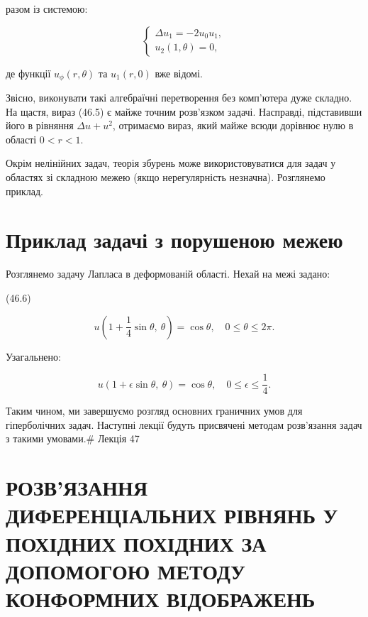 \documentclass[
  ukrainian,
]{article}
\begin{document}
разом із системою:

\[
\begin{cases}
\Delta u_{1} = -2u_{0}u_{1}, \\
u_{2}(1,\theta) = 0,
\end{cases}
\]

де функції \(u_{\phi}(r,\theta)\) та \(u_{1}(r,0)\) вже відомі.

Звісно, виконувати такі алгебраїчні перетворення без комп'ютера дуже
складно. На щастя, вираз (46.5) є майже точним розв'язком задачі.
Насправді, підставивши його в рівняння \(\Delta u + u^{2}\), отримаємо
вираз, який майже всюди дорівнює нулю в області \(0 < r < 1\).

Окрім нелінійних задач, теорія збурень може використовуватися для задач
у областях зі складною межею (якщо нерегулярність незначна). Розглянемо
приклад.

\section{Приклад задачі з порушеною
межею}\label{ux43fux440ux438ux43aux43bux430ux434-ux437ux430ux434ux430ux447ux456-ux437-ux43fux43eux440ux443ux448ux435ux43dux43eux44e-ux43cux435ux436ux435ux44e}

Розглянемо задачу Лапласа в деформованій області. Нехай на межі задано:

(46.6)

\[
u\left(1 + \frac{1}{4} \sin \theta,\ \theta\right) = \cos \theta,\quad 0 \le \theta \le 2\pi.
\]

Узагальнено:

\[
u(1+\epsilon\sin\theta,\ \theta) = \cos\theta,\quad 0 \le \epsilon \le \frac{1}{4}.
\]

Таким чином, ми завершуємо розгляд основних граничних умов для
гіперболічних задач. Наступні лекції будуть присвячені методам
розв'язання задач з такими умовами.\# Лекція 47

\section{РОЗВ'ЯЗАННЯ ДИФЕРЕНЦІАЛЬНИХ РІВНЯНЬ У ПОХІДНИХ ПОХІДНИХ ЗА
ДОПОМОГОЮ МЕТОДУ КОНФОРМНИХ
ВІДОБРАЖЕНЬ}\label{ux440ux43eux437ux432ux44fux437ux430ux43dux43dux44f-ux434ux438ux444ux435ux440ux435ux43dux446ux456ux430ux43bux44cux43dux438ux445-ux440ux456ux432ux43dux44fux43dux44c-ux443-ux43fux43eux445ux456ux434ux43dux438ux445-ux43fux43eux445ux456ux434ux43dux438ux445-ux437ux430-ux434ux43eux43fux43eux43cux43eux433ux43eux44e-ux43cux435ux442ux43eux434ux443-ux43aux43eux43dux444ux43eux440ux43cux43dux438ux445-ux432ux456ux434ux43eux431ux440ux430ux436ux435ux43dux44c}
\end{document}

